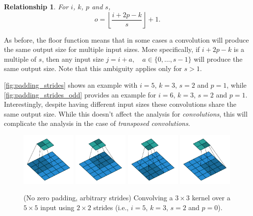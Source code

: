\documentclass[notitlepage]{report}
\newtheorem{relationship}{Relationship}
\begin{document}
\begin{relationship}\label{rel:padding_strides}
For $i$, $k$, $p$ and $s$,
\begin{equation*}
    o = \left\lfloor \frac{i + 2p - k}{s} \right\rfloor + 1.
\end{equation*}
\end{relationship}

\noindent As before, the floor function means that in some cases a convolution
will produce the same output size for multiple input sizes. More specifically,
if $i + 2p - k$ is a multiple of $s$, then any input size $j = i + a, \quad a
\in \{0,\ldots,s - 1\}$ will produce the same output size. Note that this
ambiguity applies only for $s > 1$.

\autoref{fig:padding_strides} shows an example with $i = 5$, $k = 3$, $s = 2$
and $p = 1$, while \autoref{fig:padding_strides_odd} provides an example for
$i = 6$, $k = 3$, $s = 2$ and $p = 1$. Interestingly, despite having different
input sizes these convolutions share the same output size. While this doesn't
affect the analysis for {\em convolutions}, this will complicate the analysis
in the case of {\em transposed convolutions}.

\begin{figure}[p]
    \centering
    \includegraphics[width=0.24\textwidth]{pdf/no_padding_strides_00.pdf}
    \includegraphics[width=0.24\textwidth]{pdf/no_padding_strides_01.pdf}
    \includegraphics[width=0.24\textwidth]{pdf/no_padding_strides_02.pdf}
    \includegraphics[width=0.24\textwidth]{pdf/no_padding_strides_03.pdf}
    \caption{\label{fig:no_padding_strides} (No zero padding, arbitrary
        strides) Convolving a $3 \times 3$ kernel over a $5 \times 5$ input
        using $2 \times 2$ strides (i.e., $i = 5$, $k = 3$, $s = 2$ and
        $p = 0$).}
\end{figure}
\end{document}
